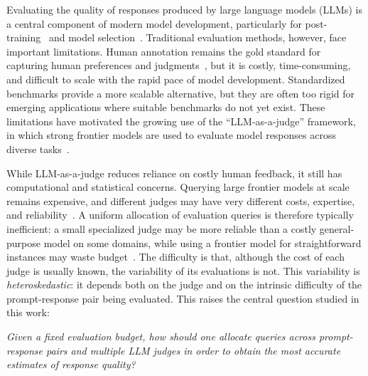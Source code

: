 \documentclass{article}
\theoremstyle{plain}
\theoremstyle{definition}
\theoremstyle{plain}
\begin{document}
Evaluating the quality of responses produced by large language models (LLMs) is a central component of modern model development, particularly for post-training~\citep{Ouyang2022TrainingLM, rafailov2023direct, guo2025deepseek, bai2022constitutional} and model selection~\citep{fernandez2026radar}. Traditional evaluation methods, however, face important limitations. Human annotation remains the gold standard for capturing human preferences and judgments~\citep{Ouyang2022TrainingLM, rafailov2023direct}, but it is costly, time-consuming, and difficult to scale with the rapid pace of model development. Standardized benchmarks provide a more scalable alternative, but they are often too rigid for emerging applications where suitable benchmarks do not yet exist. These limitations have motivated the growing use of the ``LLM-as-a-judge'' framework, in which strong frontier models are used to evaluate model responses across diverse tasks~\citep{zheng2023judging, kim-etal-2024-prometheus,gu2025surveyllmasajudge}.

While LLM-as-a-judge reduces reliance on costly human feedback, it still has computational and statistical concerns.
Querying large frontier models at scale remains expensive, and different judges may have very different costs, expertise, and reliability~\citep{kim-etal-2024-prometheus, li2024llms, raju-etal-2024-constructing}. A uniform allocation of evaluation queries is therefore typically inefficient: a small specialized judge may be more reliable than a costly general-purpose model on some domains, while using a frontier model for straightforward instances may waste budget~\citep{fernandez2026radar}.
The difficulty is that, although the cost of each judge is usually known, the variability of its evaluations is not.
This variability is \emph{heteroskedastic}: it depends both on the judge and on the intrinsic difficulty of the prompt-response pair being evaluated. This raises the central question studied in this work:
\begin{center}
    {\it Given a fixed evaluation budget, how should one allocate queries across prompt-response pairs and multiple LLM judges in order to obtain the most accurate estimates of response quality?}
\end{center}
\end{document}
